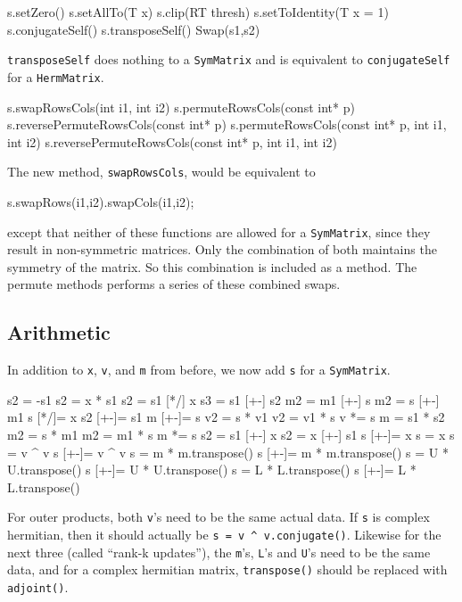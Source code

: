 \documentclass[twoside,letterpaper,11pt]{article}
\renewcommand{\tt}[1]{{\lstinline {#1}}}
\begin{document}
\begin{tmvcode}
s.setZero()
s.setAllTo(T x)
s.clip(RT thresh)
s.setToIdentity(T x = 1)
s.conjugateSelf()
s.transposeSelf()
Swap(s1,s2)
\end{tmvcode}
\tt{transposeSelf} does nothing to a \tt{SymMatrix} and is equivalent to
\tt{conjugateSelf} for a \tt{HermMatrix}.
\begin{tmvcode}
s.swapRowsCols(int i1, int i2)
s.permuteRowsCols(const int* p)
s.reversePermuteRowsCols(const int* p)
s.permuteRowsCols(const int* p, int i1, int i2)
s.reversePermuteRowsCols(const int* p, int i1, int i2)
\end{tmvcode}
The new method, \tt{swapRowsCols}, would be equivalent to 
\begin{tmvcode}
s.swapRows(i1,i2).swapCols(i1,i2);
\end{tmvcode}
except that neither of these functions are allowed for a \tt{SymMatrix}, since 
they result in non-symmetric matrices.  Only the combination of both
maintains the symmetry of the matrix.  So this combination is included as
a method.  The permute methods performs a series of these
combined swaps.
\vspace{12pt}

\subsection{Arithmetic}
\label{SymMatrix_Arithmetic}

In addition to \tt{x}, \tt{v}, and \tt{m} from before,
we now add \tt{s} for a \tt{SymMatrix}.

\begin{tmvcode}
s2 = -s1
s2 = x * s1
s2 = s1 [*/] x
s3 = s1 [+-] s2
m2 = m1 [+-] s
m2 = s [+-] m1
s [*/]= x
s2 [+-]= s1
m [+-]= s
v2 = s * v1
v2 = v1 * s
v *= s
m = s1 * s2
m2 = s * m1
m2 = m1 * s
m *= s
s2 = s1 [+-] x
s2 = x [+-] s1
s [+-]= x
s = x
s = v ^ v
s [+-]= v ^ v
s = m * m.transpose()
s [+-]= m * m.transpose()
s = U * U.transpose()
s [+-]= U * U.transpose()
s = L * L.transpose()
s [+-]= L * L.transpose()
\end{tmvcode}
For outer products, both \tt{v}'s need to be the same actual data.  If \tt{s}
is complex hermitian, then it should actually be 
\tt{s = v ^ v.conjugate()}.
Likewise for the next three (called ``rank-k updates''), the \tt{m}'s, \tt{L}'s and
\tt{U}'s need to be the
same data, and for a complex hermitian matrix, \tt{transpose()}
should be replaced with \tt{adjoint()}.
\end{document}
